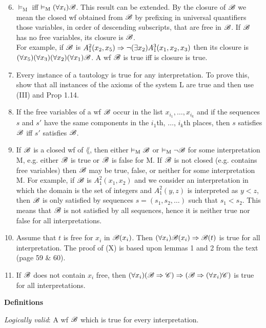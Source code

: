 \begin{enumerate} [label = \Roman*.]
  \setcounter{enumi}{5}
  \item $\vDash_\text{M}$ iff $\vDash_\text{M} (\forall x_i) \mathscr{B}$. 
  This result can be extended. By the closure of $\mathscr{B}$ we mean the closed wf obtained from $\mathscr{B}$ by prefixing in universal quantifiers those variables, in order of descending subscripts, that are free in $\mathscr{B}$. If $\mathscr{B}$ has no free variables, its closure is $\mathscr{B}$. \\
  For example, if $\mathscr{B}$ is $A_1^2(x_2,x_5) \Rightarrow \lnot(\exists x_2) A_1^3(x_1, x_2, x_3)$ then its closure is $(\forall x_5)(\forall x_3)(\forall x_2)(\forall x_1) \mathscr{B}$. A wf $\mathscr{B}$ is true iff is closure is true.
  \item Every instance of a tautology is true for any interpretation. To prove this, show that all instances of the axioms of the system L are true and then use (III) and Prop 1.14.
  \item If the free variables of a wf $\mathscr{B}$ occur in the list $x_{i_1},\dots, x_{i_k}$ and if the sequences $s$ and $s'$ have the same components in the $i_1$th, $\dots$, $i_k$th places, then $s$ satisfies $\mathscr{B}$ iff $s'$ satisfies $\mathscr{B}$.
  \item If $\mathscr{B}$ is a closed wf of $\lang$, then either $\vDash_\text{M} \mathscr{B}$ or $\vDash_\text{M} \lnot \mathscr{B}$ for some interpretation M, e.g. either $\mathscr{B}$ is true or $\mathscr{B}$ is false for M. If $\mathscr{B}$ is not closed (e.g. contains free variables) then $\mathscr{B}$ may be true, false, or neither for some interpretation M. For example, if $\mathscr{B}$ is $A_1^2(x_1,x_2)$ and we consider an interpretation in which the domain is the set of integers and $A_1^2(y,z)$ is interpreted as $y<z$, then $\mathscr{B}$ is only satisfied by sequences $s=(s_1,s_2,\dots)$ such that $s_1<s_2$. This means that $\mathscr{B}$ is not satisfied by all sequences, hence it is neither true nor false for all interpretations.
  \item Assume that $t$ is free for $x_i$ in $\mathscr{B}(x_i)$. Then $(\forall x_i) \mathscr{B}(x_i) \Rightarrow \mathscr{B}(t)$ is true for all interpretation. The proof of (X) is based upon lemmas 1 and 2 from the text (page 59 \& 60).
  \item If $\mathscr{B}$ does not contain $x_i$ free, then $(\forall x_i)(\mathscr{B} \Rightarrow \mathscr{C}) \Rightarrow (\mathscr{B} \Rightarrow (\forall x_i) \mathscr{C})$ is true for all interpretations.
\end{enumerate} 

\textbf{Definitions}

\textit{Logically valid}: A wf $\mathscr{B}$ which is true for every interpretation.

